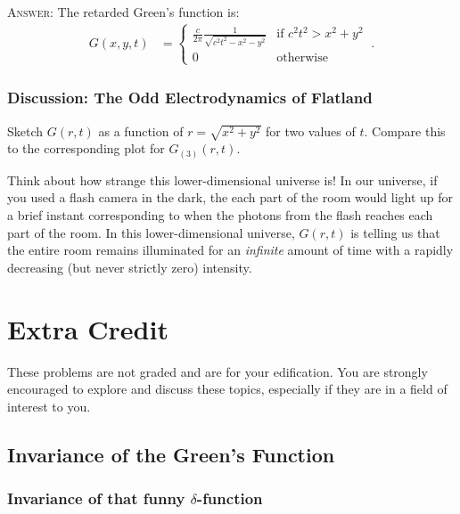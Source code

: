 \documentclass[12pt]{article}
\numberwithin{equation}{subsection}    %
\begin{document}
\textsc{Answer:} The retarded Green's function is:
\begin{align}
	G(x,y,t)  &= 
	\left\{
	\begin{array}{ll}
		\frac{c}{2\pi} \frac{1}{\sqrt{c^2 t^2 - x^2 - y^2}}
		& \text{if } c^2t^2 > x^2 + y^2\\
		0 & \text{otherwise}
	\end{array}
	\right. \ .
\end{align}


\subsubsection{Discussion: The Odd Electrodynamics of Flatland}

Sketch $G(r,t)$ as a function of $r = \sqrt{x^2 + y^2}$ for two values of $t$. Compare this to the corresponding plot for $G_{(3)}(r,t)$. 

Think about how strange this lower-dimensional universe is! In our universe, if you used a flash camera in the dark, the each part of the room would light up for a brief instant corresponding to when the photons from the flash reaches each part of the room. In this lower-dimensional universe, $G(r,t)$ is telling us that the entire room remains illuminated for an \emph{infinite} amount of time with a rapidly decreasing (but never strictly zero) intensity.











\appendix
\section*{\Large Extra Credit}


These problems are not graded and are for your edification. You are strongly encouraged to explore and discuss these topics, especially if they are in a field of interest to you.

\subsection{Invariance of the Green's Function}

\subsubsection{Invariance of that funny $\delta$-function}
\end{document}
